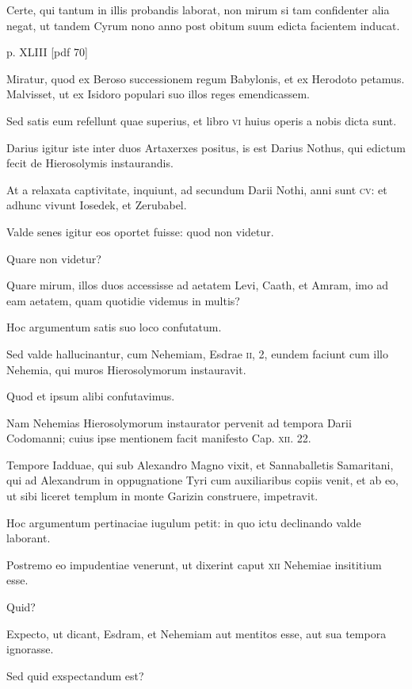 \begin{parnumbers}
Certe, qui tantum in
illis probandis laborat, non mirum si tam confidenter alia negat, ut
tandem Cyrum nono anno post obitum suum edicta facientem inducat.

\clearpage
p. XLIII [pdf 70]

Miratur, quod ex Beroso successionem regum Babylonis, et
ex Herodoto petamus. Malvisset, ut ex Isidoro populari suo illos
reges emendicassem.

Sed satis eum refellunt quae superius, et libro
\textsc{vi} huius operis a nobis dicta sunt.

Darius igitur iste inter duos Artaxerxes
positus, is est Darius Nothus, qui edictum fecit de Hierosolymis
instaurandis.

At a relaxata captivitate, inquiunt, ad secundum
Darii Nothi, anni sunt \textsc{cv}: et adhunc vivunt Iosedek, et Zerubabel.

Valde senes igitur eos oportet fuisse: quod non videtur.

Quare non videtur?

Quare mirum, illos duos accessisse ad aetatem
Levi, Caath, et Amram, imo ad eam aetatem, quam quotidie videmus
in multis?

Hoc argumentum satis suo loco confutatum.

Sed
valde hallucinantur, cum Nehemiam, Esdrae \textsc{ii}, 2, eundem faciunt
cum illo Nehemia, qui muros Hierosolymorum instauravit.

Quod et ipsum alibi confutavimus.

Nam Nehemias Hierosolymorum
instaurator pervenit ad tempora Darii Codomanni;
cuius ipse mentionem facit manifesto Cap. \textsc{xii}. 22.

Tempore Iadduae,
qui sub Alexandro Magno vixit, et Sannaballetis Samaritani,
qui ad Alexandrum in oppugnatione Tyri cum auxiliaribus
copiis venit, et ab eo, ut sibi liceret templum in monte Garizin
construere, impetravit.

Hoc argumentum pertinaciae iugulum
petit: in quo ictu declinando valde laborant.

Postremo
eo impudentiae venerunt, ut dixerint caput \textsc{xii} Nehemiae insititium
esse.

Quid?

Expecto, ut dicant, Esdram, et Nehemiam aut
mentitos esse, aut sua tempora ignorasse.

Sed quid exspectandum
est?


\end{parnumbers}
